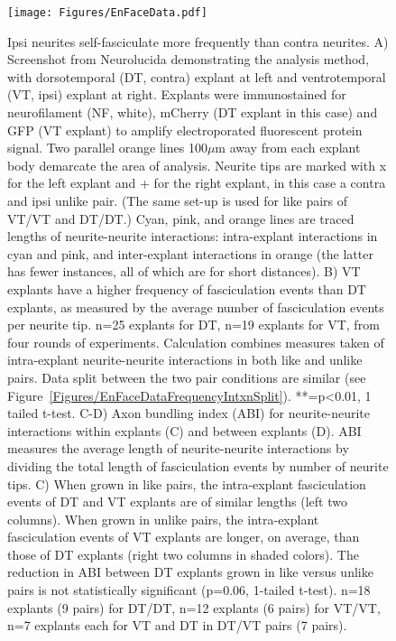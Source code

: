 \begin{figure}[hbtp]
    \begin{center}
        \texttt{[image: Figures/EnFaceData.pdf]}
        \caption[Ipsi neurites self-fasciculate more frequently than contra neurites.]
        {Ipsi neurites self-fasciculate more frequently than contra neurites.
        A) Screenshot from Neurolucida demonstrating the analysis method, with dorsotemporal (DT, contra) explant at left and ventrotemporal (VT, ipsi) explant at right.
        Explants were immunostained for neurofilament (NF, white), mCherry (DT explant in this case) and GFP (VT explant) to amplify electroporated fluorescent protein signal.
        Two parallel orange lines 100$\mu$m away from each explant body demarcate the area of analysis.
        Neurite tips are marked with x for the left explant and + for the right explant, in this case a contra and ipsi unlike pair.
        (The same set-up is used for like pairs of VT/VT and DT/DT.)
        Cyan, pink, and orange lines are traced lengths of neurite-neurite interactions: intra-explant interactions in cyan and pink, and inter-explant interactions in orange (the latter has fewer instances, all of which are for short distances).
        B) VT explants have a higher frequency of fasciculation events than DT explants, as measured by the average number of fasciculation events per neurite tip.
        n=25 explants for DT, n=19 explants for VT, from four rounds of experiments.
        Calculation combines measures taken of intra-explant neurite-neurite interactions in both like and unlike pairs.
        Data split between the two pair conditions are similar (see Figure~\ref{Figures/EnFaceDataFrequencyIntxnSplit}).
        **=p<0.01, 1 tailed t-test.
        C-D) Axon bundling index (ABI) for neurite-neurite interactions within explants (C) and between explants (D).
        ABI measures the average length of neurite-neurite interactions by dividing the total length of fasciculation events by number of neurite tips.
        C) When grown in like pairs, the intra-explant fasciculation events of DT and VT explants are of similar lengths (left two columns).
        When grown in unlike pairs, the intra-explant fasciculation events of VT explants are longer, on average, than those of DT explants (right two columns in shaded colors).
        The reduction in ABI between DT explants grown in like versus unlike pairs is not statistically significant (p=0.06, 1-tailed t-test).
        n=18 explants (9 pairs) for DT/DT, n=12 explants (6 pairs) for VT/VT, n=7 explants each for VT and DT in DT/VT pairs (7 pairs).
}
\end{center}
\end{figure}
